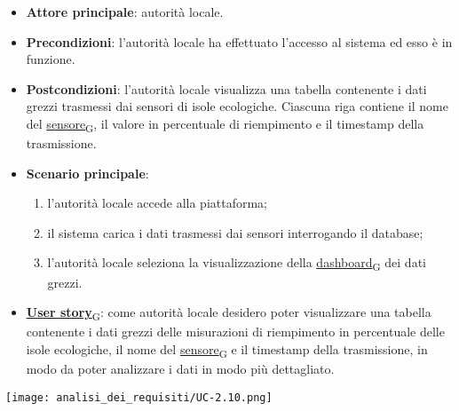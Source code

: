 \begin{itemize}
	\item \textbf{Attore principale}: autorità locale.
	\item \textbf{Precondizioni}: l'autorità locale ha effettuato l'accesso al sistema ed esso è in funzione.
	\item \textbf{Postcondizioni}: l'autorità locale visualizza una tabella contenente i dati grezzi trasmessi dai sensori di isole ecologiche.
	      Ciascuna riga contiene il nome del \href{https://7last.github.io/docs/pb/documentazione-interna/glossario\#sensore}{sensore\textsubscript{G}}, il valore in percentuale di riempimento e il timestamp della trasmissione.
	\item \textbf{Scenario principale}:
	      \begin{enumerate}
		      \item l'autorità locale accede alla piattaforma;
		      \item il sistema carica i dati trasmessi dai sensori interrogando il database;
		      \item l'autorità locale seleziona la visualizzazione della \href{https://7last.github.io/docs/pb/documentazione-interna/glossario\#dashboard}{dashboard\textsubscript{G}} dei dati grezzi.
	      \end{enumerate}
	\item \href{https://7last.github.io/docs/pb/documentazione-interna/glossario\#user-story}{\textbf{User story}\textsubscript{G}}:
	      come autorità locale desidero poter visualizzare una tabella contenente i dati grezzi delle misurazioni di riempimento in percentuale delle isole ecologiche,
	      il nome del \href{https://7last.github.io/docs/pb/documentazione-interna/glossario\#sensore}{sensore\textsubscript{G}} e il timestamp della trasmissione, in modo da poter analizzare i dati in modo più dettagliato.
\end{itemize}
\begin{center}
	\texttt{[image: analisi\_dei\_requisiti/UC-2.10.png]}
\end{center}


